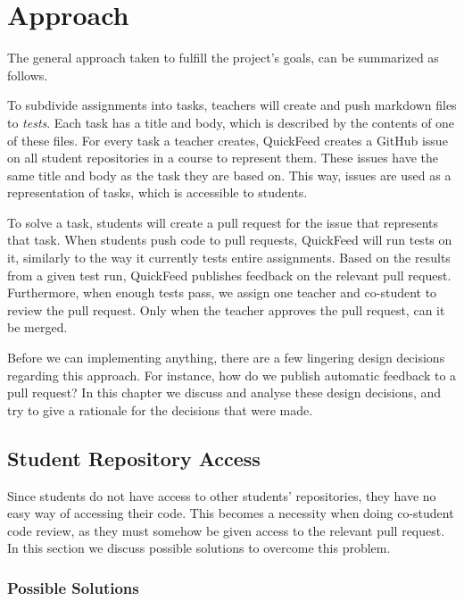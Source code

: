 
\chapter{Approach}
\label{ch:approach}

The general approach taken to fulfill the project's goals, can be summarized as follows.

To subdivide assignments into tasks, teachers will create and push markdown files to \textit{tests}.
Each task has a title and body, which is described by the contents of one of these files.
For every task a teacher creates, QuickFeed creates a GitHub issue on all student repositories in a course to represent them.
These issues have the same title and body as the task they are based on.
This way, issues are used as a representation of tasks, which is accessible to students.

To solve a task, students will create a pull request for the issue that represents that task.
When students push code to pull requests, QuickFeed will run tests on it, similarly to the way it currently tests entire assignments.
Based on the results from a given test run, QuickFeed publishes feedback on the relevant pull request.
Furthermore, when enough tests pass, we assign one teacher and co-student to review the pull request.
Only when the teacher approves the pull request, can it be merged.

Before we can implementing anything, there are a few lingering design decisions regarding this approach.
For instance, how do we publish automatic feedback to a pull request?
In this chapter we discuss and analyse these design decisions, and try to give a rationale for the decisions that were made.

\section{Student Repository Access}

Since students do not have access to other students' repositories, they have no easy way of accessing their code.
This becomes a necessity when doing co-student code review, as they must somehow be given access to the relevant pull request.
In this section we discuss possible solutions to overcome this problem.

\subsection{Possible Solutions}

